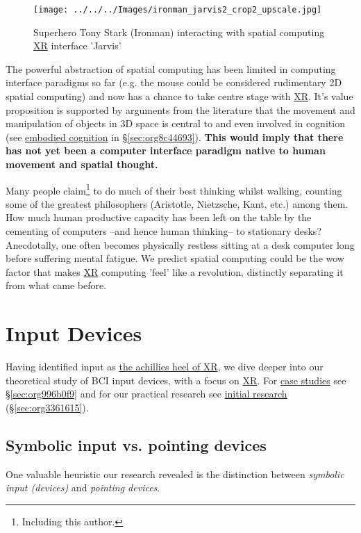 \documentclass[logo,bsc,singlespacing,parskip]{infthesis}
\begin{document}
\begin{figure}[h]
\centering
\texttt{[image: ../../../Images/ironman\_jarvis2\_crop2\_upscale.jpg]}
\caption{Superhero Tony Stark (Ironman) interacting with spatial computing \hyperref[orgf7f8e78]{XR} interface 'Jarvis'}
\end{figure}

The powerful abstraction of spatial computing has been limited in computing interface paradigms so far (e.g. the mouse could be considered rudimentary 2D spatial computing) and now has a chance to take centre stage with \hyperref[orgf7f8e78]{XR}.
It's value proposition is supported by arguments from the literature that the movement and manipulation of objects in 3D space is central to and even involved in cognition (see \hyperref[org68031b0]{embodied cognition} in \S \ref{sec:org8c44693}).
\textbf{This would imply that there has not yet been a computer interface paradigm native to human movement and spatial thought.}

Many people claim\footnote{Including this author.} to do much of their best thinking whilst walking, counting some of the greatest philosophers (Aristotle, Nietzsche, Kant, etc.) among them.
How much human productive capacity has been left on the table by the cementing of computers --and hence human thinking-- to stationary desks?
Anecdotally, one often becomes physically restless sitting at a desk computer long before suffering mental fatigue.
We predict spatial computing could be the wow factor that makes \hyperref[orgf7f8e78]{XR} computing 'feel' like a revolution, distinctly separating it from what came before.

\chapter{Input Devices}
\label{sec:org0f6e30a}
Having identified input as \hyperref[sec:org23de37e]{the achillies heel of XR}, we dive deeper into our theoretical study of BCI input devices, with a focus on \hyperref[orgf7f8e78]{XR}.
For \hyperref[sec:org996b0f9]{case studies} see \S \ref{sec:org996b0f9} and for our practical research see \hyperref[sec:org3361615]{initial research} (\S \ref{sec:org3361615}).
\section{Symbolic input vs. pointing devices}
\label{sec:org8139500}
One valuable heuristic our research revealed is the distinction between \emph{symbolic input (devices)} and \emph{pointing devices}.
\end{document}
